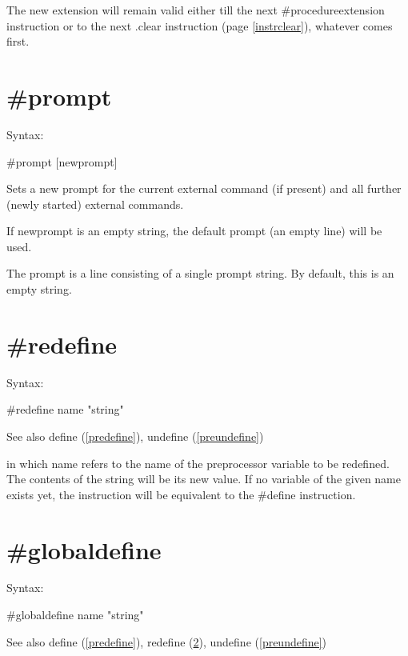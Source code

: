 \noindent The new extension will remain valid either till the next 
\#procedureextension instruction or to the next .clear 
instruction (page \ref{instrclear}), whatever comes first.


\section{\#prompt}
\label{preprompt}

\noindent Syntax:

\#prompt [newprompt]

\noindent Sets a new prompt for the current external 
command (if present) and all further (newly started) external commands.

If newprompt is an empty string, the default prompt (an empty line) will be 
used.

The prompt is a line consisting of a single prompt string. By 
default, this is an empty string.


\section{\#redefine}
\label{preredefine}

\noindent Syntax:

\#redefine name "string"
 
\noindent See also define (\ref{predefine}), undefine 
(\ref{preundefine})

\noindent in which name refers to the name of the 
preprocessor 
variable to be redefined. The contents of the 
string will be its new value. If no variable of the given name exists yet, 
the instruction will be equivalent to the \#define 
instruction.

 
\section{\#globaldefine}
\label{preglobaldefine}
 
\noindent Syntax:
 
\#globaldefine name "string"
 
\noindent See also define (\ref{predefine}), redefine (\ref{preredefine}), 
           undefine (\ref{preundefine})
 
